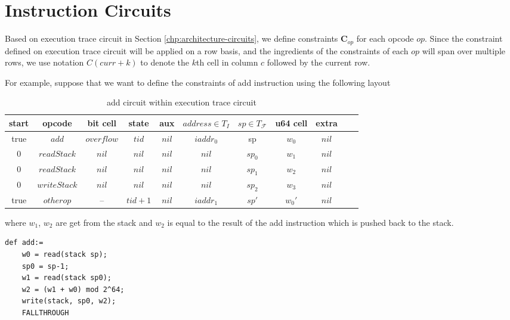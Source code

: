\section{Instruction Circuits}
Based on execution trace circuit in Section \ref{chp:architecture-circuits}, we define constraints $\mathbf{C}_{op}$ for each opcode $op$. Since the constraint defined on execution trace circuit will be applied on a row basis, and the ingredients of the constraints of each $op$ will span over multiple rows, we use notation $C(curr+k)$ to denote the $k$th cell in column $c$ followed by the current row.

For example, suppose that we want to define the constraints of add instruction using the following layout

\begin{table}[!h]
\begin{center}
\begin{tabular}{ | c | c | c | c | c | c | c | c | c | c | c | }
  \hline
  start & opcode & bit cell & state & aux & $address \in T_{I}$ & $sp \in T_\mathcal{F}$& u64 cell & extra \\ 
  \hline
   true & $add$ & $overflow$ & $tid$ & $nil$ & $iaddr_0$ & sp & $w_0$ & $nil$\\ 
 \hline
   0 & $readStack$ & $nil$ & $nil$ & $nil$ & $nil$ & $sp_0$ & $w_1$ & $nil$\\ 
 \hline
   0 & $readStack$ & $nil$ & $nil$ & $nil$ & $nil$ & $sp_1$ & $w_2$ & $nil$\\ 
 \hline
   0 & $writeStack$ & $nil$ & $nil$ & $nil$ & $nil$ & $sp_2$ & $w_3$ & $nil$\\ 
 \hline
   true & $otherop$ & -- & $tid+1$ & $nil$ & $iaddr_1$ & $sp'$ & $w_0'$ & $nil$\\
 \hline
\end{tabular}
\caption{add circuit within execution trace circuit}
\label{tbl:ex-table}
\end{center}
\end{table}
\noindent where $w_1$, $w_2$ are get from the stack and $w_2$ is equal to the result of the add instruction which is pushed back to the stack.
\begin{verbatim}
def add:=
    w0 = read(stack sp);
    sp0 = sp-1;
    w1 = read(stack sp0);
    w2 = (w1 + w0) mod 2^64;
    write(stack, sp0, w2);
    FALLTHROUGH
\end{verbatim}

